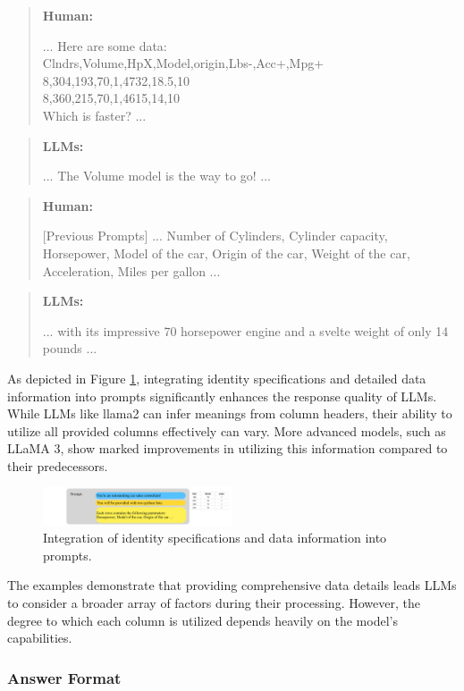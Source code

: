 \documentclass{ieeeaccess}
\newenvironment{human}{
    \begin{quote}
    \textbf{Human:}
}{\end{quote}}
\newenvironment{chatgpt}{
    \begin{quote}
    \textbf{LLMs:}
}{\end{quote}}
\begin{document}
\begin{human}
... Here are some data: \\
Clndrs,Volume,HpX,Model,origin,Lbs-,Acc+,Mpg+ \\
8,304,193,70,1,4732,18.5,10 \\
8,360,215,70,1,4615,14,10 \\
Which is faster? ...
\end{human}

\begin{chatgpt}
... The Volume model is the way to go! ...
\end{chatgpt}

\begin{human}
[Previous Prompts] ... Number of Cylinders, Cylinder capacity, Horsepower, Model of the car, Origin of the car, Weight of the car, Acceleration, Miles per gallon ...
\end{human}

\begin{chatgpt}
... with its impressive 70 horsepower engine and a svelte weight of only 14 pounds ...
\end{chatgpt}

As depicted in Figure \ref{fig.2}, integrating identity specifications and detailed data information into prompts significantly enhances the response quality of LLMs. While LLMs like llama2 can infer meanings from column headers, their ability to utilize all provided columns effectively can vary. More advanced models, such as LLaMA 3, show marked improvements in utilizing this information compared to their predecessors.

\begin{figure}[ht]
\centering
\includegraphics[page=1,width=0.5\textwidth]{llm1.pdf}
\caption{Integration of identity specifications and data information into prompts.} %
\label{fig.2}
\end{figure}

The examples demonstrate that providing comprehensive data details leads LLMs to consider a broader array of factors during their processing. However, the degree to which each column is utilized depends heavily on the model’s capabilities.

\subsubsection{Answer Format}
\end{document}
